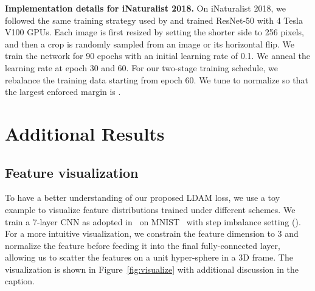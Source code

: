 \documentclass{article}
\begin{document}
\textbf{Implementation details for iNaturalist 2018.} On iNaturalist 2018, we followed the same training strategy used by \citep{he2016deep} and trained ResNet-50 with 4 Tesla V100 GPUs. Each image is first resized by setting the shorter side to 256 pixels, and then a  crop is randomly sampled from an image or its horizontal flip. We train the network for 90 epochs with an initial learning rate of 0.1. We anneal the learning rate at epoch 30 and 60. For our two-stage training schedule, we rebalance the training data starting from epoch 60. We tune  to normalize  so that the largest enforced margin is .


\section{Additional Results}

\subsection{Feature visualization} 

To have a better understanding of our proposed LDAM loss, we use a toy example to visualize feature distributions trained under different schemes. We train a 7-layer CNN as adopted in~\citep{liu2017rethinking} on MNIST~\citep{lecun1998gradient} with step imbalance setting (). For a more intuitive visualization, we constrain the feature dimension to 3 and normalize the feature before feeding it into the final fully-connected layer, allowing us to scatter the features on a unit hyper-sphere in a 3D frame. The visualization is shown in Figure~\ref{fig:visualize} with additional discussion in the caption. 
\end{document}
